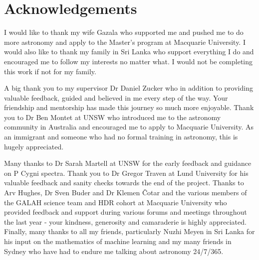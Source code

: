 \chapter{Acknowledgements}

I would like to thank my wife Gazala who supported me and pushed me to do more astronomy and apply to the Master's program at Macquarie University. I would also like to thank my family in Sri Lanka who support everything I do and encouraged me to follow my interests no matter what. I would not be completing this work if not for my family.

A big thank you to my supervisor Dr Daniel Zucker who in addition to providing valuable feedback, guided and believed in me every step of the way. Your friendship and mentorship has made this journey so much more enjoyable. Thank you to Dr Ben Montet at UNSW who introduced me to the astronomy community in Australia and encouraged me to apply to Macquarie University. As an immigrant and someone who had no formal training in astronomy, this is hugely appreciated.

Many thanks to Dr Sarah Martell at UNSW for the early feedback and guidance on P Cygni spectra. Thank you to Dr Gregor Traven at Lund University for his valuable feedback and sanity checks towards the end of the project. Thanks to Arv Hughes, Dr Sven Buder and Dr Klemen Čotar and the various members of the GALAH science team and HDR cohort at Macquarie University who provided feedback and support during various forums and meetings throughout the last year - your kindness, generosity and camaraderie is highly appreciated. Finally, many thanks to all my friends, particularly Nuzhi Meyen in Sri Lanka for his input on the mathematics of machine learning and my many friends in Sydney who have had to endure me talking about astronomy 24/7/365.